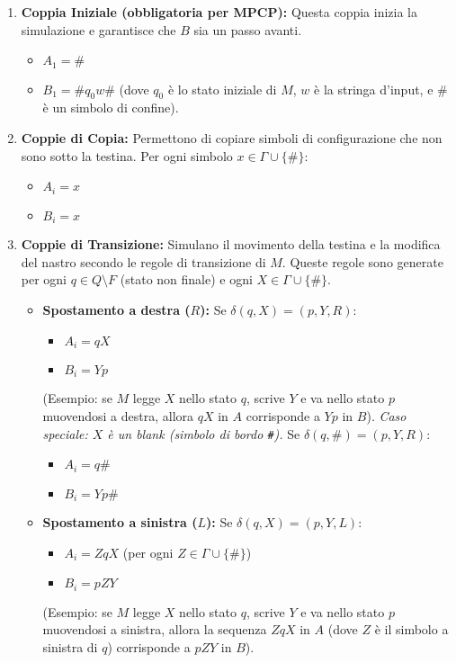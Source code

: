 \documentclass[a4paper, 11pt]{book} %
\theoremstyle{definition}
\begin{document}
\begin{enumerate}
    \item \textbf{Coppia Iniziale (obbligatoria per MPCP):}
    Questa coppia inizia la simulazione e garantisce che $B$ sia un passo avanti.
    \begin{itemize}
        \item $A_1 = \#$
        \item $B_1 = \# q_0 w \#$ (dove $q_0$ è lo stato iniziale di $M$, $w$ è la stringa d'input, e $\#$ è un simbolo di confine).
    \end{itemize}

    \item \textbf{Coppie di Copia:}
    Permettono di copiare simboli di configurazione che non sono sotto la testina.
    Per ogni simbolo $x \in \Gamma \cup \{\#\}$:
    \begin{itemize}
        \item $A_i = x$
        \item $B_i = x$
    \end{itemize}

    \item \textbf{Coppie di Transizione:}
    Simulano il movimento della testina e la modifica del nastro secondo le regole di transizione di $M$. Queste regole sono generate per ogni $q \in Q \setminus F$ (stato non finale) e ogni $X \in \Gamma \cup \{\#\}$.
    \begin{itemize}
        \item \textbf{Spostamento a destra ($R$):} Se $\delta(q, X) = (p, Y, R)$:
            \begin{itemize}
                \item $A_i = qX$
                \item $B_i = Yp$
            \end{itemize}
            (Esempio: se $M$ legge $X$ nello stato $q$, scrive $Y$ e va nello stato $p$ muovendosi a destra, allora $qX$ in $A$ corrisponde a $Yp$ in $B$).
            \emph{Caso speciale: $X$ è un blank (simbolo di bordo \texttt{\#}).} Se $\delta(q, \#) = (p, Y, R)$:
            \begin{itemize}
                \item $A_i = q\#$
                \item $B_i = Yp\#$
            \end{itemize}
        \item \textbf{Spostamento a sinistra ($L$):} Se $\delta(q, X) = (p, Y, L)$:
            \begin{itemize}
                \item $A_i = ZqX$ (per ogni $Z \in \Gamma \cup \{\#\}$)
                \item $B_i = pZY$
            \end{itemize}
            (Esempio: se $M$ legge $X$ nello stato $q$, scrive $Y$ e va nello stato $p$ muovendosi a sinistra, allora la sequenza $ZqX$ in $A$ (dove $Z$ è il simbolo a sinistra di $q$) corrisponde a $pZY$ in $B$).
    \end{itemize}


\end{enumerate}
\end{document}

